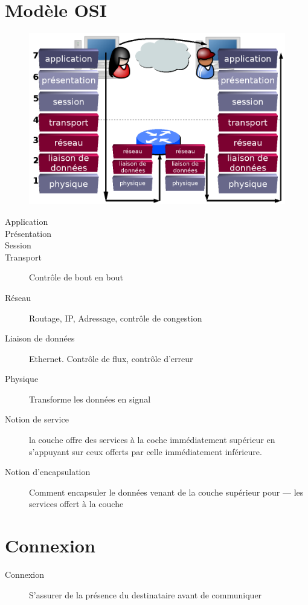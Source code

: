 \documentclass[12pt,a4paper,openany]{book}
\begin{document}
	\chapter{Modèle OSI}
	\begin{figure}[H]
		\centering
		\includegraphics[width=13cm]{osi-model.png}
	\end{figure}
	\begin{description}
		\item[Application]
		\item[Présentation]
		\item[Session]
		\item[Transport] Contrôle de bout en bout
		\item[Réseau] Routage, IP, Adressage, contrôle de congestion
		\item[Liaison de données] Ethernet. Contrôle de flux, contrôle d'erreur
		\item[Physique] Transforme les données en signal
	\end{description}
	\begin{description}
		\item[Notion de service] la couche offre des services à la coche immédiatement supérieur en s'appuyant sur ceux offerts par celle immédiatement inférieure.
		\item[Notion d'encapsulation] Comment encapsuler le données venant de la couche supérieur pour --- les services offert à la couche
	\end{description}

	\chapter{Connexion}
	\begin{description}
		\item[Connexion] S'assurer de la présence du destinataire avant de communiquer
	\end{description}
\end{document}
